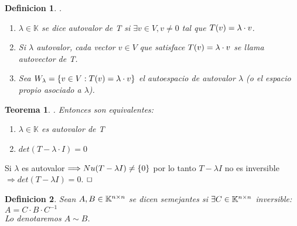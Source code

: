 \documentclass[]{article}
\newtheorem{theorem}{Teorema}
\newtheorem{definition}{Definicion}
\newenvironment{proof}{\noindent{\bf Prueba:}}{$\hfill \Box$ \vspace{10pt}}
\newcommand{\K}{
    \mathbb{K}
}
\newcommand{\ida}{\Longrightarrow}
\begin{document}
\newpage

\begin{definition}
    .
    \begin{enumerate}
        \item $\lambda \in \K$ se dice autovalor de T si $\exists v \in V , v\neq0$ tal que $\text{$T({v})$}=\lambda\cdot v$.
        \item Si $\lambda$ autovalor, cada vector $v\in V$ que satisface $\text{$T({v})$}=\lambda\cdot v$ se llama
        autovector de T.
        \item Sea $W_\lambda = \text{$\{ {v\in V : \text{$T({v})$}=\lambda\cdot v} \}$}$ el autoespacio de autovalor $\lambda$
        (o el espacio propio asociado a $\lambda$). 
    \end{enumerate}
\end{definition}
\begin{theorem}
    . Entonces son equivalentes:
    \begin{enumerate}
        \item $\lambda \in \K$ es autovalor de T
        \item $det(T-\lambda\cdot I)=0$
    \end{enumerate}
\end{theorem}
\begin{proof}
    Si $\lambda$ es autovalor $\ida Nu(T-\lambda I)\neq \conjunto{0}$ por lo tanto $T-\lambda I$ no es inversible
    $\ida det(T-\lambda I)=0$.
\end{proof}

\begin{definition}
    Sean $A,B \in \text{$\mathbb{K}^{n \times n}$}$ se dicen semejantes si $\exists C \in \text{$\mathbb{K}^{n \times n}$}$ inversible:  $A=C \cdot B \cdot C^{-1}$\\
    Lo denotaremos $A \sim B$.
\end{definition}
\end{document}
